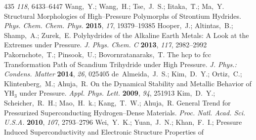 \documentclass[12pt,letterpaper,oneside]{article}
\begin{document}
\begin{mcitethebibliography}{435}
  \emph{118}, 6433--6447\relax
\mciteBstWouldAddEndPuncttrue
\mciteSetBstMidEndSepPunct{\mcitedefaultmidpunct}
{\mcitedefaultendpunct}{\mcitedefaultseppunct}\relax
\EndOfBibitem
{}
Wang,~Y.; Wang,~H.; Tse,~J.~S.; Iitaka,~T.; Ma,~Y. Structural Morphologies of
  High--Pressure Polymorphs of Strontium Hydrides. \emph{Phys. Chem. Chem.
  Phys.} \textbf{2015}, \emph{17}, 19379--19385\relax
\mciteBstWouldAddEndPuncttrue
\mciteSetBstMidEndSepPunct{\mcitedefaultmidpunct}
{\mcitedefaultendpunct}{\mcitedefaultseppunct}\relax
\EndOfBibitem
{}
Hooper,~J.; Altintas,~B.; Shamp,~A.; Zurek,~E. Polyhydrides of the Alkaline
  Earth Metals: A Look at the Extremes under Pressure. \emph{J. Phys. Chem. C}
  \textbf{2013}, \emph{117}, 2982--2992\relax
\mciteBstWouldAddEndPuncttrue
\mciteSetBstMidEndSepPunct{\mcitedefaultmidpunct}
{\mcitedefaultendpunct}{\mcitedefaultseppunct}\relax
\EndOfBibitem
{}
Pakornchote,~T.; Pinsook,~U.; Bovornratanaraks,~T. The hcp to fcc
  Transformation Path of Scandium Trihydride under High Pressure. \emph{J.
  Phys.: Condens. Matter} \textbf{2014}, \emph{26}, 025405\relax
\mciteBstWouldAddEndPuncttrue
\mciteSetBstMidEndSepPunct{\mcitedefaultmidpunct}
{\mcitedefaultendpunct}{\mcitedefaultseppunct}\relax
\EndOfBibitem
{}
de~Almeida,~J.~S.; Kim,~D.~Y.; Ortiz,~C.; Klintenberg,~M.; Ahuja,~R. On the
  Dynamical Stability and Metallic Behavior of YH$_3$ under Pressure.
  \emph{Appl. Phys. Lett.} \textbf{2009}, \emph{94}, 251913\relax
\mciteBstWouldAddEndPuncttrue
\mciteSetBstMidEndSepPunct{\mcitedefaultmidpunct}
{\mcitedefaultendpunct}{\mcitedefaultseppunct}\relax
\EndOfBibitem
{}
Kim,~D.~Y.; Scheicher,~R.~H.; Mao,~H.~k.; Kang,~T.~W.; Ahuja,~R. General Trend
  for Pressurized Superconducting Hydrogen--Dense Materials. \emph{Proc. Natl.
  Acad. Sci. U.S.A.} \textbf{2010}, \emph{107}, 2793--2796\relax
\mciteBstWouldAddEndPuncttrue
\mciteSetBstMidEndSepPunct{\mcitedefaultmidpunct}
{\mcitedefaultendpunct}{\mcitedefaultseppunct}\relax
\EndOfBibitem
{}
Wei,~Y.~K.; Yuan,~J.~N.; Khan,~F.~I.; 
  Pressure Induced Superconductivity and Electronic Structure Properties of

\end{mcitethebibliography}
\end{document}
